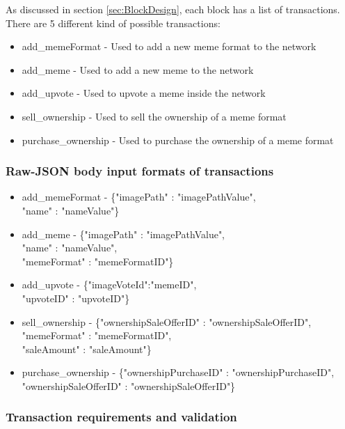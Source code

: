 \documentclass[12pt]{article}
\begin{document}
As discussed in section \ref{sec:BlockDesign}, each block has a list of transactions. There are 5 different kind of possible transactions:
\begin{itemize}
  \item add\_memeFormat - Used to add a new meme format to the network
  \item add\_meme - Used to add a new meme to the network
  \item add\_upvote - Used to upvote a meme inside the network
  \item sell\_ownership - Used to sell the ownership of a meme format
  \item purchase\_ownership - Used to purchase the ownership of a meme format
\end{itemize}

\subsubsection{Raw-JSON body input formats of transactions}

\begin{itemize}
\item add\_memeFormat - \{"imagePath" : "imagePathValue",\\ "name" : "nameValue"\}

\item add\_meme - \{"imagePath" : "imagePathValue",\\ "name" : "nameValue",\\ "memeFormat" : "memeFormatID"\}

\item add\_upvote - \{"imageVoteId":"memeID",\\ "upvoteID" : "upvoteID"\}

\item sell\_ownership - \{"ownershipSaleOfferID" : "ownershipSaleOfferID",\\ "memeFormat" : "memeFormatID",\\ "saleAmount" : "saleAmount"\}

\item purchase\_ownership - \{"ownershipPurchaseID" : "ownershipPurchaseID",\\ "ownershipSaleOfferID" : "ownershipSaleOfferID"\}
\end{itemize}

\subsubsection{Transaction requirements and validation}
\end{document}
